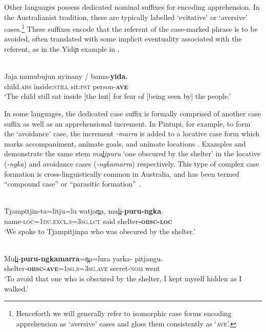 \documentclass[output=paper,colorlinks,citecolor=brown]{langscibook}
\begin{document}
 Other languages possess dedicated nominal suffixes for encoding apprehension. In the Australianist tradition, these are typically labelled `evitative' or `aversive' cases.\footnote{Henceforth we will generally refer to isomorphic case forms encoding apprehension as `aversive' cases and gloss them consistently as `\textsc{ave}'.} These suffixes encode that the referent of the case-marked phrase is to be avoided, often translated with some implicit eventuality associated with the referent, as in the Yidiɲ example in .

\ea 
{} {\citealt[262]{dixon_grammar_1977}} \\
\gll Jaja munubujun {nyinany \textnormal{/}} bama-\textbf{yida.} \\
child.\textsc{abs} inside:\textsc{still} sit:\textsc{pst} person-\textsc{\textbf{ave}} \\
\glt `The child still sat inside [the hut] for fear of [being seen by] the people.'
\label{ex:bro4}
\z

 In some languages, the dedicated case suffix is formally comprised of another case suffix as well as an apprehensional increment. In Pintupi, for example, to form the `avoidance' case, the increment \textit{-marra} is added to a locative case form which marks accompaniment, animate goals, and animate locations \citep[57]{hansen_core_1978}. Examples  and  demonstrate the same stem \textit{mul̪ipuru} `one obscured by the shelter' in the locative (\textit{-ngka}) and avoidance cases (\textit{-ngkamarra}) respectively. This type of complex case formation is cross-linguistically common in Australia, and has been termed ``compound case'' \citep[256]{schweiger_compound_2000} or ``parasitic formation'' \citep[85--86]{matthews_morphology_1991}.



\ea
{} {\citealt[99]{hansen_core_1978}} \\
\gll Tjampitjin-ta=litju=lu watja{n̪}u, mul̪i-\textbf{puru-ngka}. \\
name-\textsc{loc=1du.excl.s=3sg.lct} said shelter\textbf{-\textsc{obsc-loc}}\\
\glt `We spoke to Tjampitjinpa who was obscured by the shelter.' 
\label{ex:bro5}
\z


\ea
{} {\citealt[99]{hansen_core_1978}} \\
\gll Mul̪i-\textbf{puru-ngkamarra}=n̪a=lura {yarka-\emptyset} pitjangu. \\
shelter-\textbf{\textsc{obsc-ave}}=\textsc{1sg.s=3sg.ave} secret-\textsc{nom} went \\
\glt `To avoid that one who is obscured by the shelter, I kept myself hidden as I walked.'
\label{ex:bro6}
\z
\end{document}
